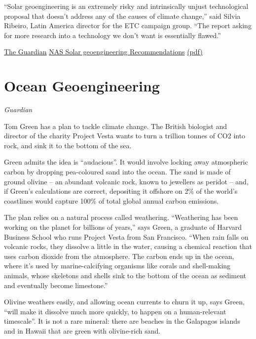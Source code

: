 \documentclass[
]{book}
\begin{document}
``Solar geoengineering is an extremely risky and intrinsically unjust technological proposal that doesn't address any of the causes of climate change,'' said Silvia Ribeiro, Latin America director for the ETC campaign group. ``The report asking for more research into a technology we don't want is essentially flawed.''

\href{https://www.theguardian.com/environment/2021/mar/25/top-us-scientists-back-100m-geoengineering-research-proposal}{The Guardian}
\href{https://www.nap.edu/download/25762}{NAS Solar geoengineering Recommendations}
\href{pdf/NAS_2021_Sun_Geoengineering.pdf}{(pdf)}

\hypertarget{ocean-geoengineering}{%
\section{Ocean Geoengineering}\label{ocean-geoengineering}}

\emph{Guardian}

Tom Green has a plan to tackle climate change. The British biologist and director of the charity Project Vesta wants to turn a trillion tonnes of CO2 into rock, and sink it to the bottom of the sea.

Green admits the idea is ``audacious''. It would involve locking away atmospheric carbon by dropping pea-coloured sand into the ocean. The sand is made of ground olivine -- an abundant volcanic rock, known to jewellers as peridot -- and, if Green's calculations are correct, depositing it offshore on 2\% of the world's coastlines would capture 100\% of total global annual carbon emissions.

The plan relies on a natural process called weathering. ``Weathering has been working on the planet for billions of years,'' says Green, a graduate of Harvard Business School who runs Project Vesta from San Francisco. ``When rain falls on volcanic rocks, they dissolve a little in the water, causing a chemical reaction that uses carbon dioxide from the atmosphere. The carbon ends up in the ocean, where it's used by marine-calcifying organisms like corals and shell-making animals, whose skeletons and shells sink to the bottom of the ocean as sediment and eventually become limestone.''

Olivine weathers easily, and allowing ocean currents to churn it up, says Green, ``will make it dissolve much more quickly, to happen on a human-relevant timescale''. It is not a rare mineral: there are beaches in the Galapagos islands and in Hawaii that are green with olivine-rich sand.
\end{document}
